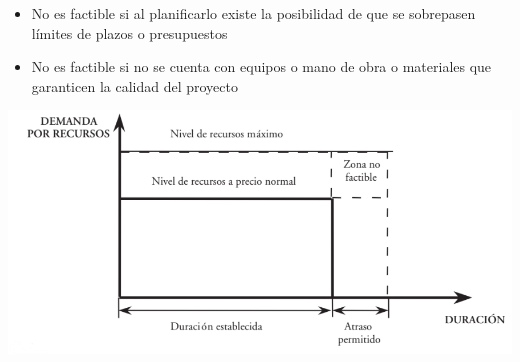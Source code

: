 \documentclass{article} %
\begin{document}
\begin{minipage}{0.45\textwidth}
    \begin{itemize}[label={},left=0pt,align=parleft]
        \item \begin{highlightbox}[levelone] No es factible si al planificarlo existe la posibilidad de que se sobrepasen límites de plazos o presupuestos \end{highlightbox}
        \item \begin{highlightbox}[levelone] No es factible si no se cuenta con equipos o mano de obra o materiales que garanticen la calidad del proyecto \end{highlightbox}
    \end{itemize}
\end{minipage}
\hfill
\begin{minipage}{0.5\textwidth}
    \centering
    \includegraphics[width=1.2\textwidth]{factibilidad_proyecto.png}
\end{minipage}
\end{document}
